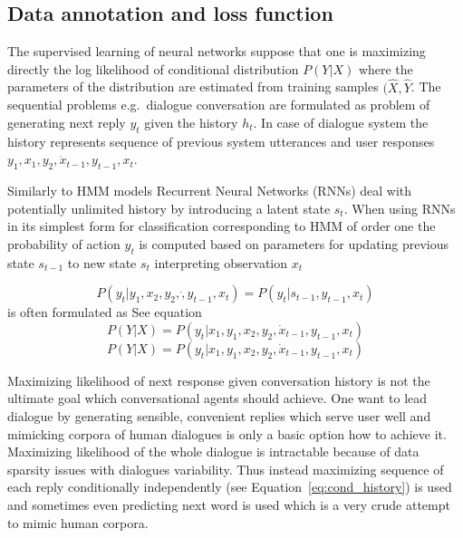 \documentclass[11pt]{article}
\begin{document}
\subsection{Data annotation and loss function}
\label{sub:data_annotation}

The supervised learning of neural networks suppose that one is maximizing directly the log likelihood of conditional distribution $ P(Y| X) $ where the parameters of the distribution are estimated from training samples $ (\hat{X}, \hat{Y} $.
The sequential problems e.g.\ dialogue conversation are formulated as problem of generating next reply $y_t$ given the history $h_t$.
In case of dialogue system the history represents sequence of previous system utterances and user responses $ y_1, x_1, y_2, \dot x_{t-1}, y_{t-1}, x_t $.

Similarly to HMM models Recurrent Neural Networks (RNNs) deal with potentially unlimited history by introducing a latent state $ s_t$.
When using RNNs~\cite{schidhuber/previous} in its simplest form for classification corresponding to HMM of order one the probability of action $ y_t $ is computed based on parameters for updating previous state $s_{t-1}$ to new state $s_t$ interpreting observation $x_t$ 

\begin{equation}
    P(y_t| y_1, x_2, y_2, \dot, y_{t-1}, x_t) = P(y_t | s_{t-1}, y_{t-1}, x_t)
\end{equation}
is often formulated as  See equation
\begin{equation}
    P(Y|X) = P(y_t | x_1, y_1, x_2, y_2, \dot x_{t-1}, y_{t-1}, x_t)
\end{equation}
\begin{equation}
    \label{eq:cond_history}
    P(Y|X) = P(y_t | x_1, y_1, x_2, y_2, \dot x_{t-1}, y_{t-1}, x_t)
\end{equation}

Maximizing likelihood of next response given conversation history is not the ultimate goal which conversational agents should achieve.
One want to lead dialogue by generating sensible, convenient replies which serve user well and mimicking corpora of human dialogues is only a basic option how to achieve it.
Maximizing likelihood of the whole dialogue is intractable because of data sparsity issues with dialogues variability.
Thus instead maximizing sequence of each reply conditionally independently (see Equation~\ref{eq:cond_history}) is used and sometimes even predicting next word is used which is a very crude attempt to mimic human corpora.
\end{document}
